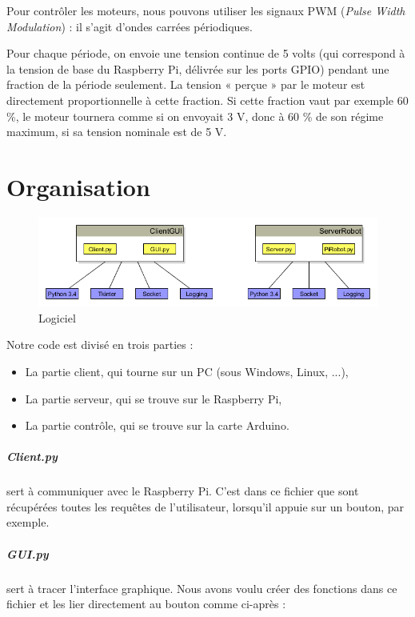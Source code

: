 \documentclass[12pt,a4paper]{report}
\begin{document}
Pour contrôler les moteurs, nous pouvons utiliser les signaux PWM (\textit{Pulse Width Modulation}) : il s'agit d'ondes carrées périodiques. 

Pour chaque période, on envoie une tension continue de 5 volts (qui correspond à la tension de base du Raspberry Pi, délivrée sur les ports GPIO) pendant une fraction de la période seulement. La tension « perçue » par le moteur est directement proportionnelle à cette fraction. Si cette fraction vaut par exemple 60 \%, le moteur tournera comme si on envoyait 3 V, donc à 60 \% de son régime maximum, si sa tension nominale est de 5 V. 

\chapter{Organisation}

\begin{figure}[hf!]
\center
\includegraphics[scale=0.6]{GraphLogiciel.png}
\caption{Logiciel}
\end{figure}

Notre code est divisé en trois parties :

\bigbreak

\begin{itemize}
\item La partie client, qui tourne sur un PC (sous Windows, Linux, ...),
\item La partie serveur, qui se trouve sur le Raspberry Pi,
\item La partie contrôle, qui se trouve sur la carte Arduino.
\end{itemize}

\bigbreak

\paragraph{Client.py} sert à communiquer avec le Raspberry Pi. C'est dans ce fichier que sont récupérées toutes les requêtes de l'utilisateur, lorsqu'il appuie sur un bouton, par exemple.

\paragraph{GUI.py} sert à tracer l'interface graphique. Nous avons voulu créer des fonctions dans ce fichier et les lier directement au bouton comme ci-après :
\end{document}
